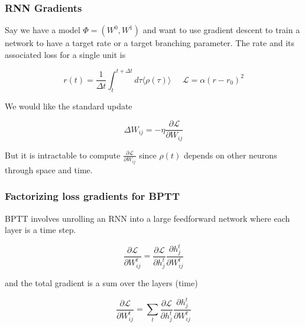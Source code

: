 \documentclass{beamer}
\begin{document}
\begin{frame}[plain]
\frametitle{RNN Gradients} 

Say we have a model $\Phi = (W^{0},W^{1})$ and want to use gradient descent to train a network to have a target rate or a target branching parameter. The rate and its associated loss for a single unit is

\begin{equation*}
r(t) = \frac{1}{\Delta t}\int_{t}^{t+\Delta t} d\tau \langle \rho(\tau)\rangle\;\;\;\;\;\mathcal{L} = \alpha(r-r_{0})^{2}
\end{equation*}

We would like the standard update 

\begin{equation*}
\Delta W_{ij} = -\eta \frac{\partial\mathcal{L}}{\partial W_{ij}}
\end{equation*}


But it is intractable to compute $\frac{\partial\mathcal{L}}{\partial W_{ij}}$ since $\rho(t)$ depends on other neurons through space and time.


\end{frame}


\begin{frame}[plain]
\frametitle{Factorizing loss gradients for BPTT} 

BPTT involves unrolling an RNN into a large feedforward network where each layer is a time step. 

\begin{equation*}
\frac{\partial\mathcal{L}}{\partial W^{t}_{ij}} = \frac{\partial\mathcal{L}}{\partial h^{t}_{j}}  \frac{\partial h^{t}_{j}}{{\partial W^{t}_{ij}}} 
\end{equation*}

and the total gradient is a sum over the layers (time)

\begin{equation*}
\frac{\partial\mathcal{L}}{\partial W^{t}_{ij}} = \sum_{t} \frac{\partial\mathcal{L}}{\partial h^{t}_{j}}  \frac{\partial h^{t}_{j}}{{\partial W^{t}_{ij}}} 
\end{equation*}

\end{frame}
\end{document}
